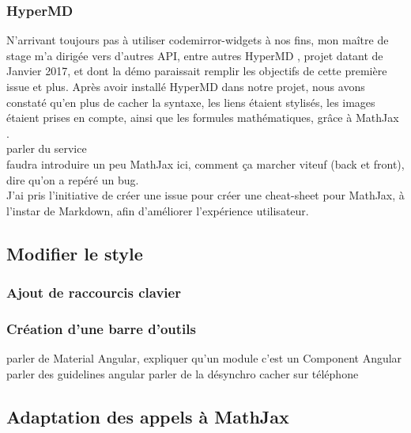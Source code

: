 \documentclass[12pt]{article}
\begin{document}
\subsubsection{HyperMD}
N'arrivant toujours pas à utiliser codemirror-widgets à nos fins, mon maître de stage m'a dirigée vers d'autres API, entre autres HyperMD \cite{hypermd}, projet datant de Janvier 2017, et dont la démo \cite{demo} paraissait remplir les objectifs de cette première issue et plus.
Après avoir installé HyperMD dans notre projet, nous avons constaté qu'en plus de cacher la syntaxe, les liens étaient stylisés, les images étaient prises en compte, ainsi que les formules mathématiques, grâce à MathJax \cite{mathjax}.\\


parler du service\\
faudra introduire un peu MathJax ici, comment ça marcher viteuf (back et front), dire qu'on a repéré un bug.\\
J'ai pris l'initiative de créer une issue pour créer une cheat-sheet pour MathJax, à l'instar de Markdown, afin d'améliorer l'expérience utilisateur.\\

\newpage
\subsection{Modifier le style}
\subsubsection{Ajout de raccourcis clavier}

\subsubsection{Création d'une barre d'outils}
parler de Material Angular, expliquer qu'un module c'est un Component Angular
parler des guidelines angular
parler de la désynchro
cacher sur téléphone

\newpage
\subsection{Adaptation des appels à MathJax}
\end{document}

